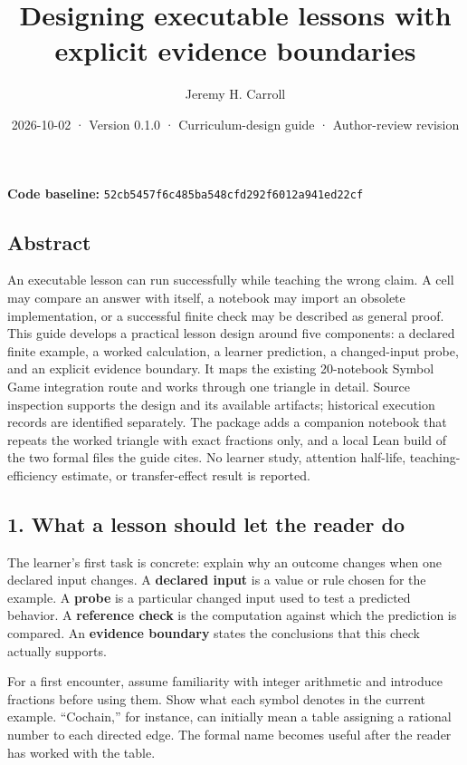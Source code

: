 \documentclass[
  11pt,
]{article}
\title{Designing executable lessons with explicit evidence boundaries}
\author{Jeremy H. Carroll}
\date{2026-10-02 · Version 0.1.0 · Curriculum-design guide ·
Author-review revision}
\begin{document}
\makeatletter
\begin{center}
{\LARGE \@title\par}
\vspace{0.8em}
{\normalsize \@author\par}
\vspace{0.5em}
{\small \@date\par}
\end{center}
\makeatother

\textbf{Code baseline:}
\nolinkurl{52cb5457f6c485ba548cfd292f6012a941ed22cf}

\subsection{Abstract}\label{abstract}

An executable lesson can run successfully while teaching the wrong
claim. A cell may compare an answer with itself, a notebook may import
an obsolete implementation, or a successful finite check may be
described as general proof. This guide develops a practical lesson
design around five components: a declared finite example, a worked
calculation, a learner prediction, a changed-input probe, and an
explicit evidence boundary. It maps the existing 20-notebook Symbol Game
integration route and works through one triangle in detail. Source
inspection supports the design and its available artifacts; historical
execution records are identified separately. The package adds a
companion notebook that repeats the worked triangle with exact fractions
only, and a local Lean build of the two formal files the guide cites. No
learner study, attention half-life, teaching-efficiency estimate, or
transfer-effect result is reported.

\subsection{1. What a lesson should let the reader
do}\label{what-a-lesson-should-let-the-reader-do}

The learner's first task is concrete: explain why an outcome changes
when one declared input changes. A \textbf{declared input} is a value or
rule chosen for the example. A \textbf{probe} is a particular changed
input used to test a predicted behavior. A \textbf{reference check} is
the computation against which the prediction is compared. An
\textbf{evidence boundary} states the conclusions that this check
actually supports.

For a first encounter, assume familiarity with integer arithmetic and
introduce fractions before using them. Show what each symbol denotes in
the current example. ``Cochain,'' for instance, can initially mean a
table assigning a rational number to each directed edge. The formal name
becomes useful after the reader has worked with the table.
\end{document}
